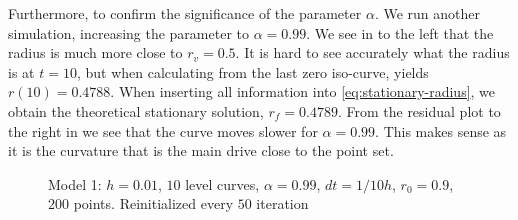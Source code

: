 Furthermore, to confirm the significance of the parameter $\alpha$. We run another simulation, increasing the parameter to $\alpha=0.99$. We see in  to the left that the radius is much more close to $r_v=0.5$. It is hard to see accurately what the radius is at $t=10$, but when calculating from the last zero iso-curve, yields $r(10)=0.4788$. When inserting all information into \eqref{eq:stationary-radius}, we obtain the theoretical stationary solution, $r_f=0.4789$. From the residual plot to the right in  we see that the curve moves slower for $\alpha=0.99$. This makes sense as it is the curvature that is the main drive close to the point set.

\begin{figure}
\begin{center}
\end{center}
\vspace{-2.5em}
\caption[Model 1 - Circular example $\alpha=0.99$]{Model 1: $h=0.01$, $10$ level curves, $\alpha=0.99$, $dt=1/10h$, $r_0=0.9$, $200$ points. Reinitialized every $50$ iteration}
\label{fig:model1-a99}
\end{figure}

